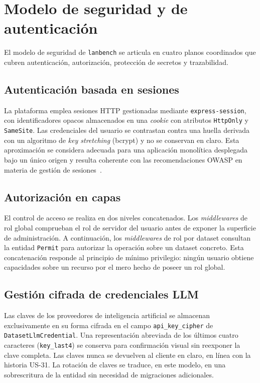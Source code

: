 \section{Modelo de seguridad y de autenticación}
\label{sec:modelo-seguridad}

El modelo de seguridad de \texttt{lanbench} se articula en cuatro planos
coordinados que cubren autenticación, autorización, protección de secretos y
trazabilidad.

\subsection{Autenticación basada en sesiones}
La plataforma emplea sesiones HTTP gestionadas mediante
\texttt{express-session}, con identificadores opacos almacenados en una
\textit{cookie} con atributos \texttt{HttpOnly} y \texttt{SameSite}. Las
credenciales del usuario se contrastan contra una huella derivada con un
algoritmo de \textit{key stretching} (bcrypt) y no se conservan en claro. Esta
aproximación se considera adecuada para una aplicación monolítica desplegada
bajo un único origen y resulta coherente con las recomendaciones OWASP en
materia de gestión de sesiones~\cite{OWASPASVS2024}.

\subsection{Autorización en capas}
El control de acceso se realiza en dos niveles concatenados. Los
\textit{middlewares} de rol global comprueban el rol de servidor del usuario
antes de exponer la superficie de administración. A continuación, los
\textit{middlewares} de rol por dataset consultan la entidad \texttt{Permit}
para autorizar la operación sobre un dataset concreto. Esta concatenación
responde al principio de mínimo privilegio: ningún usuario obtiene capacidades
sobre un recurso por el mero hecho de poseer un rol global.

\subsection{Gestión cifrada de credenciales LLM}
Las claves de los proveedores de inteligencia artificial se almacenan
exclusivamente en su forma cifrada en el campo \texttt{api\_key\_cipher} de
\texttt{Dataset\-Llm\-Credential}. Una representación abreviada de los últimos
cuatro caracteres (\texttt{key\_last4}) se conserva para confirmación visual
sin reexponer la clave completa. Las claves nunca se devuelven al cliente en
claro, en línea con la historia US-31. La rotación de claves se traduce, en
este modelo, en una sobrescritura de la entidad sin necesidad de migraciones
adicionales.

